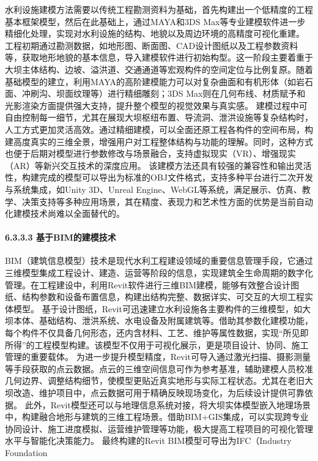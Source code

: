 水利设施建模方法需要以传统工程勘测资料为基础，首先构建出一个低精度的工程基本框架模型，然后在此基础上，通过MAYA和3DS Max等专业建模软件进一步精细化处理，实现对水利设施的结构、地貌以及周边环境的高精度可视化重建。
工程初期通过勘测数据，如地形图、断面图、CAD设计图纸以及工程参数资料等，获取地形地貌的基本信息，导入建模软件进行初始构型。这一阶段主要着重于大坝主体结构、边坡、溢洪道、交通通道等宏观构件的空间定位与比例复原。随着基础模型的建立，利用MAYA的高阶建模能力可以对复杂曲面和有机形体（如岩石面、冲刷沟、坝面纹理等）进行精细雕刻；3DS
Max则在几何布线、材质赋予和光影渲染方面提供强大支持，提升整个模型的视觉效果与真实感。
建模过程中可自由控制每一细节，尤其在展现大坝枢纽布置、导流洞、泄洪设施等复杂结构时，人工方式更加灵活高效。通过精细建模，可以全面还原工程各构件的空间布局，构建高度真实的三维全景，增强用户对工程整体结构与功能的理解。同时，这种方式也便于后期对模型进行参数修改与场景融合，支持虚拟现实（VR）、增强现实（AR）等新兴交互技术的深度应用。
该建模方法还具有较强的兼容性和输出灵活性，构建完成的模型可以导出为标准的OBJ文件格式，支持多种平台进行二次开发与系统集成，如Unity 3D、Unreal
Engine、WebGL等系统，满足展示、仿真、教学、决策支持等多种应用场景，其在精度、表现力和艺术性方面的优势是当前自动化建模技术尚难以全面替代的。 \paragraph{6.3.3.3
基于BIM的建模技术}\label{ux57faux4e8ebimux7684ux5efaux6a21ux6280ux672f}
BIM（建筑信息模型）技术是现代水利工程建设领域的重要信息管理手段，它通过三维模型集成工程设计、建造、运营等阶段的信息，实现建筑全生命周期的数字化管理。在工程建设中，利用Revit软件进行三维BIM建模，能够有效整合设计图纸、结构参数和设备布置信息，构建出结构完整、数据详实、可交互的大坝工程实体模型。
基于设计图纸，Revit可迅速建立水利设施各主要构件的三维模型，如大坝本体、基础结构、泄洪系统、水电设备及附属建筑等。借助其参数化建模功能，每个构件不仅具备几何形态，还内含材料、工艺、维护等属性数据，实现``所见即所得''的工程模型构建。该模型不仅用于可视化展示，更是项目设计、协同、施工管理的重要载体。
为进一步提升模型精度，Revit可导入通过激光扫描、摄影测量等手段获取的点云数据。点云的三维空间信息可作为参考基准，辅助建模人员校准几何边界、调整结构细节，使模型更贴近真实地形与实际工程状态。尤其在老旧大坝改造、维护项目中，点云数据可用于精确反映现场变化，为后续设计提供可靠依据。
此外，Revit模型还可以与地理信息系统对接，将大坝实体模型嵌入地理场景中，构建融合地形与建筑的三维工程场景。借助BIM+GIS集成，可以实现跨专业协同设计、施工进度模拟、运营维护管理等功能，极大提高工程项目的可视化管理水平与智能化决策能力。
最终构建的Revit BIM模型可导出为IFC（Industry Foundation
